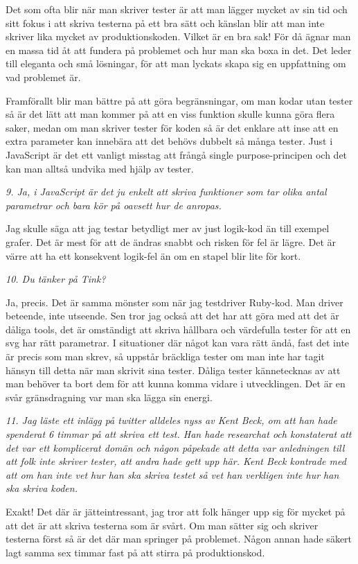 \documentclass[11pt]{article}
\begin{document}
Det som ofta blir när man skriver tester är att man lägger mycket av sin tid och sitt fokus i att skriva testerna på ett bra sätt och känslan blir att man inte skriver lika mycket av produktionskoden. Vilket är en bra sak! För då ägnar man en massa tid åt att fundera på problemet och hur man ska boxa in det. Det leder till eleganta och små lösningar, för att man lyckats skapa sig en uppfattning om vad problemet är.

Framförallt blir man bättre på att göra begränsningar, om man kodar utan tester så är det lätt att man kommer på att en viss funktion skulle kunna göra flera saker, medan om man skriver tester för koden så är det enklare att inse att en extra parameter kan innebära att det behövs dubbelt så många tester. Just i JavaScript är det ett vanligt misstag att frångå single purpose-principen och det kan man alltså undvika med hjälp av tester.

\emph{9. Ja, i JavaScript är det ju enkelt att skriva funktioner som tar olika antal parametrar och bara kör på oavsett hur de anropas.}

Jag skulle säga att jag testar betydligt mer av just logik-kod än till exempel grafer. Det är mest för att de ändras snabbt och risken för fel är lägre. Det är värre att ha ett konsekvent logik-fel än om en stapel blir lite för kort.

\emph{10. Du tänker på Tink?}

Ja, precis. Det är samma mönster som när jag testdriver Ruby-kod. Man driver beteende, inte utseende. Sen tror jag också att det har att göra med att det är dåliga tools, det är omständigt att skriva hållbara och värdefulla tester för att en svg har rätt parametrar. I situationer där något kan vara rätt ändå, fast det inte är precis som man skrev, så uppstår bräckliga tester om man inte har tagit hänsyn till detta när man skrivit sina tester. Dåliga tester kännetecknas av att man behöver ta bort dem för att kunna komma vidare i utvecklingen. Det är en svår gränsdragning var man ska lägga sin energi.

\emph{11. Jag läste ett inlägg på twitter alldeles nyss av Kent Beck, om att han hade spenderat 6 timmar på att skriva ett test. Han hade researchat och konstaterat att det var ett komplicerat domän och någon påpekade att detta var anledningen till att folk inte skriver tester, att andra hade gett upp här. Kent Beck kontrade med att om han inte vet hur han ska skriva testet så vet han verkligen inte hur han ska skriva koden.}

Exakt! Det där är jätteintressant, jag tror att folk hänger upp sig för mycket på att det är att skriva testerna som är svårt. Om man sätter sig och skriver testerna först så är det där man springer på problemet. Någon annan hade säkert lagt samma sex timmar fast på att stirra på produktionskod.
\end{document}

